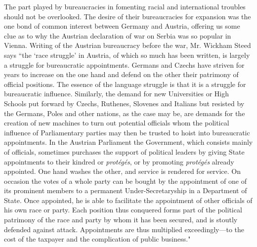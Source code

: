 \documentclass{book}
\begin{document}
The part played by bureaucracies in fomenting racial and international troubles should not be overlooked. The desire of their bureaucracies for expansion was the one bond of common interest between Germany and Austria, offering us some clue as to why the Austrian declaration of war on Serbia was so popular in Vienna. Writing of the Austrian bureaucracy before the war, Mr. Wickham Steed says “the ‘race struggle’ in Austria, of which so much has been written, is largely a struggle for bureaucratic appointments. Germans and Czechs have striven for years to increase on the one hand and defend on the other their patrimony of official positions. The essence of the language struggle is that it is a struggle for bureaucratic influence. Similarly, the demand for new Universities or High Schools put forward by Czechs, Ruthenes, Slovenes and Italians but resisted by the Germans, Poles and other nations, as the case may be, are demands for the creation of new machines to turn out potential officials whom the political influence of Parliamentary parties may then be trusted to hoist into bureaucratic appointments. In the Austrian Parliament the Government, which consists mainly of officials, sometimes purchases the support of political leaders by giving State appointments to their kindred or \emph{protégés}, or by promoting \emph{protégés} already appointed. One hand washes the other, and service is rendered for service. On occasion the votes of a whole party can be bought by the appointment of one of its prominent members to a permanent Under-Secretaryship in a Department of State. Once appointed, he is able to facilitate the appointment of other officials of his own race or party. Each position thus conquered forms part of the political patrimony of the race and party by whom it has been secured, and is stoutly defended against attack. Appointments are thus multiplied exceedingly—to the cost of the taxpayer and the complication of public business."\footnotemark[2]
\end{document}
